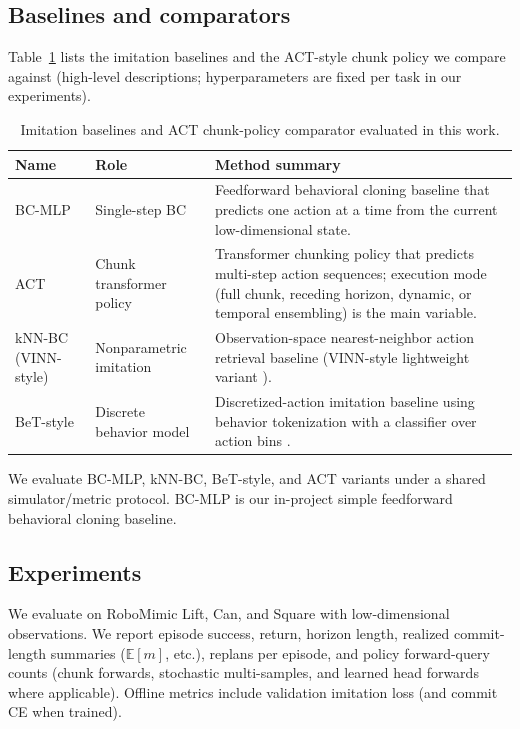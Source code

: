 \documentclass{article}
\begin{document}
\subsection{Baselines and comparators}

Table~\ref{tab:baselines} lists the imitation baselines and the ACT-style chunk policy we compare against (high-level descriptions; hyperparameters are fixed per task in our experiments).

\begin{table}[H]
\centering
\small
\begin{tabular}{@{}llp{6.2cm}@{}}
\toprule
Name & Role & Method summary \\
\midrule
BC-MLP & Single-step BC & Feedforward behavioral cloning baseline that predicts one action at a time from the current low-dimensional state. \\
ACT & Chunk transformer policy & Transformer chunking policy that predicts multi-step action sequences; execution mode (full chunk, receding horizon, dynamic, or temporal ensembling) is the main variable. \\
kNN-BC (VINN-style) & Nonparametric imitation & Observation-space nearest-neighbor action retrieval baseline (VINN-style lightweight variant \cite{vinn}). \\
BeT-style & Discrete behavior model & Discretized-action imitation baseline using behavior tokenization with a classifier over action bins \cite{bet}. \\
\bottomrule
\end{tabular}
\caption{Imitation baselines and ACT chunk-policy comparator evaluated in this work.}
\label{tab:baselines}
\end{table}

\noindent We evaluate BC-MLP, kNN-BC, BeT-style, and ACT variants under a shared simulator/metric protocol. BC-MLP is our in-project simple feedforward behavioral cloning baseline.

\subsection{Experiments}

We evaluate on RoboMimic Lift, Can, and Square with low-dimensional observations. We report episode success, return, horizon length, realized commit-length summaries ($\mathbb{E}[m]$, etc.), replans per episode, and policy forward-query counts (chunk forwards, stochastic multi-samples, and learned head forwards where applicable). Offline metrics include validation imitation loss (and commit CE when trained).
\end{document}
